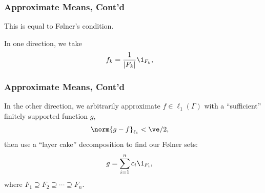 \documentclass{beamer-custom}
\begin{document}
  \begin{frame}
  \frametitle{Approximate Means, Cont'd}
  This is equal to Følner's condition.\newline

  In one direction, we take
  \begin{align*}
    f_k &= \frac{1}{\left\vert F_k \right\vert}\1_{F_k},
  \end{align*}
\end{frame}
\begin{frame}
  \frametitle{Approximate Means, Cont'd}
  In the other direction, we arbitrarily approximate $f\in\ell_1\left( \Gamma \right)$ with a ``sufficient'' finitely supported function $g$,
  \begin{align*}
    \norm{g - f}_{\ell_1} &< \ve/2,
  \end{align*}
  then use a ``layer cake'' decomposition to find our Følner sets:
  \begin{align*}
    g &= \sum_{i=1}^{n}c_i\1_{F_i},
  \end{align*}
  where $F_1\supseteq F_2\supseteq \cdots \supseteq F_n$.
\end{frame}
\end{document}
